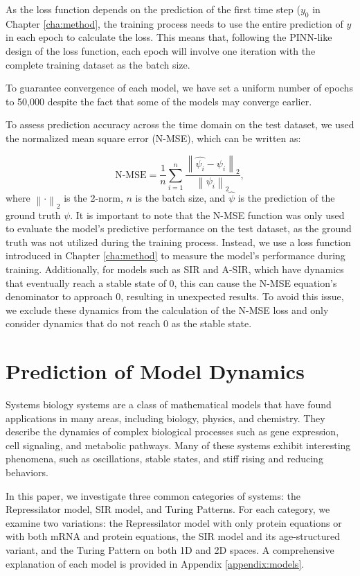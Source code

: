 As the loss function depends on the prediction of the first time step ($y_0$ in Chapter \ref{cha:method}, the training process needs to use the entire prediction of $y$ in each epoch to calculate the loss. This means that, following the PINN-like design of the loss function, each epoch will involve one iteration with the complete training dataset as the batch size.

To guarantee convergence of each model, we have set a uniform number of epochs to 50,000 despite the fact that some of the models may converge earlier.

To assess prediction accuracy across the time domain on the test dataset, we used the normalized mean square error (N-MSE), which can be written as:

\begin{equation}
\label{eq:nmse}
\text{N-MSE}=\dfrac{1}{n}\sum^{n}_{i=1}\dfrac{\left\| \hat{\psi_{i}} - \psi_{i}\right\| _{2}}{\left\| \psi_{i}\right\| _{2}},
\end{equation}
where $\left\| \cdot\right\| _{2}$ is the 2-norm, $n$ is the batch size, and $\hat{\psi}$ is the prediction of the ground truth $\psi$. It is important to note that the N-MSE function was only used to evaluate the model's predictive performance on the test dataset, as the ground truth was not utilized during the training process. Instead, we use a loss function introduced in Chapter \ref{cha:method} to measure the model's performance during training. Additionally, for models such as SIR and A-SIR, which have dynamics that eventually reach a stable state of 0, this can cause the N-MSE equation's denominator to approach 0, resulting in unexpected results. To avoid this issue, we exclude these dynamics from the calculation of the N-MSE loss and only consider dynamics that do not reach 0 as the stable state.

\section{Prediction of Model Dynamics}

Systems biology systems are a class of mathematical models that have found applications in many areas, including biology, physics, and chemistry. They describe the dynamics of complex biological processes such as gene expression, cell signaling, and metabolic pathways. Many of these systems exhibit interesting phenomena, such as oscillations, stable states, and stiff rising and reducing behaviors.

In this paper, we investigate three common categories of systems: the Repressilator model, SIR model, and Turing Patterns. For each category, we examine two variations: the Repressilator model with only protein equations or with both mRNA and protein equations, the SIR model and its age-structured variant, and the Turing Pattern on both 1D and 2D spaces. A comprehensive explanation of each model is provided in Appendix \ref{appendix:models}.

